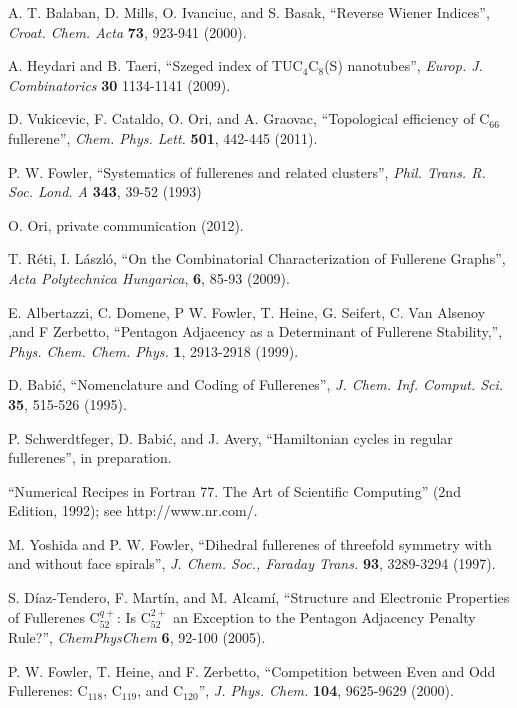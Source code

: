 \documentclass[article,a4paper,twoside]{memoir}
\newcommand{\C}[1]{\ensuremath{\mathrm{C}_{#1}}}
\begin{document}
\begin{thebibliography}{99}
 A. T. Balaban, D. Mills, O. Ivanciuc, and S. Basak, ``Reverse Wiener Indices'', \textit{Croat. Chem. Acta} \textbf{73}, 923-941 (2000).

 A. Heydari and B. Taeri, ``Szeged index of TUC$_4$C$_8$(S) nanotubes'', \textit{Europ. J. Combinatorics} \textbf{30} 1134-1141 (2009). 

 D. Vukicevic, F. Cataldo, O. Ori, and A. Graovac, ``Topological efficiency of \C{66} fullerene'', \textit{Chem. Phys. Lett.} \textbf{501}, 442-445 (2011).

 P. W. Fowler, ``Systematics of fullerenes and related clusters'', \textit{Phil. Trans. R. Soc. Lond. A} \textbf{343}, 39-52 (1993) 

 O. Ori, private communication (2012).

 T. R\'eti, I. L\'aszl\'o, ``On the Combinatorial Characterization of Fullerene Graphs'', \textit{Acta Polytechnica Hungarica}, \textbf{6}, 85-93 (2009).

 E. Albertazzi, C. Domene,  P W. Fowler, T. Heine, G. Seifert, C. Van Alsenoy ,and F Zerbetto, ``Pentagon Adjacency as a Determinant of
Fullerene Stability,'', \textit{Phys. Chem. Chem. Phys.} \textbf{1}, 2913-2918 (1999). 

 D. Babi\'c, ``Nomenclature and Coding of Fullerenes'', \textit{J. Chem. Inf. Comput. Sci.} \textbf{35}, 515-526 (1995).

 P. Schwerdtfeger, D. Babi\'c, and J. Avery, ``Hamiltonian cycles in regular fullerenes'', in preparation.

 ``Numerical Recipes in Fortran 77. The Art of Scientific Computing'' (2nd Edition, 1992); see http://www.nr.com/.

 M. Yoshida and P. W. Fowler, ``Dihedral fullerenes of threefold symmetry with and without
face spirals'', \textit{J. Chem. Soc., Faraday Trans.} \textbf{93}, 3289-3294 (1997). 

 S. D\'iaz-Tendero, F. Mart\'in, and M. Alcam\'i, ``Structure and Electronic Properties of Fullerenes C$_{52}^{q+}$: Is C$_{52}^{2+}$ an Exception to the Pentagon Adjacency Penalty Rule?'', \textit{ChemPhysChem} \textbf{6}, 92-100 (2005).

 P. W. Fowler, T. Heine, and F. Zerbetto, ``Competition between Even and Odd Fullerenes:  C$_{118}$, C$_{119}$, and C$_{120}$'', 
\textit{J. Phys. Chem.} \textbf{104}, 9625-9629 (2000).


\end{thebibliography}
\end{document}

